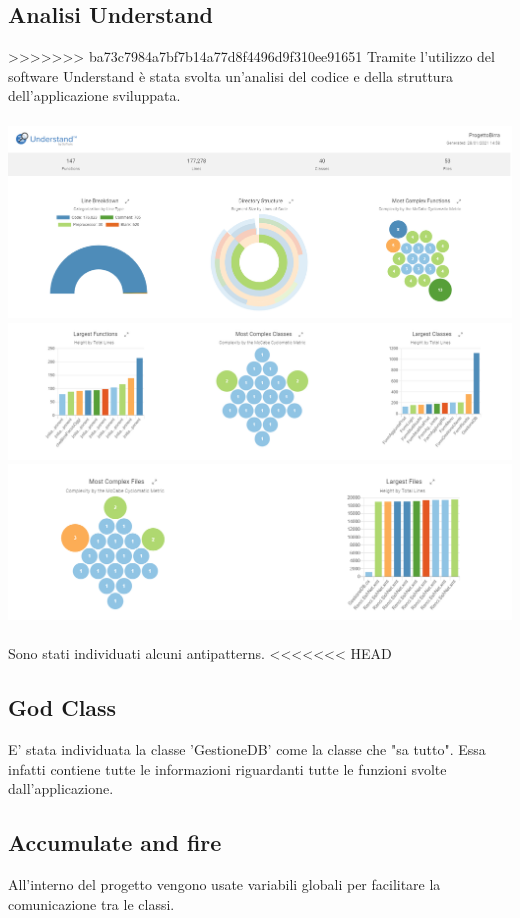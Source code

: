 \documentclass[a4paper, titlepage]{article}
\begin{document}
\subsection{Analisi Understand}
>>>>>>> ba73c7984a7bf7b14a77d8f4496d9f310ee91651
Tramite l'utilizzo del software Understand è stata svolta un'analisi del codice e della struttura dell'applicazione sviluppata.\\\\
\includegraphics[scale=0.40]{Immagini/Understand_1.png}\\
\includegraphics[scale=0.40]{Immagini/Understand_3.png}\\
\includegraphics[scale=0.40]{Immagini/Understand_2.png}\\
\\Sono stati individuati alcuni antipatterns.
<<<<<<< HEAD
\subsection{God Class}
E' stata individuata la classe 'GestioneDB' come la classe che "sa tutto". Essa infatti contiene tutte le informazioni riguardanti tutte le funzioni svolte dall'applicazione.
\subsection{Accumulate and fire}
All'interno del progetto vengono usate variabili globali per facilitare la comunicazione tra le classi.
\end{document}
